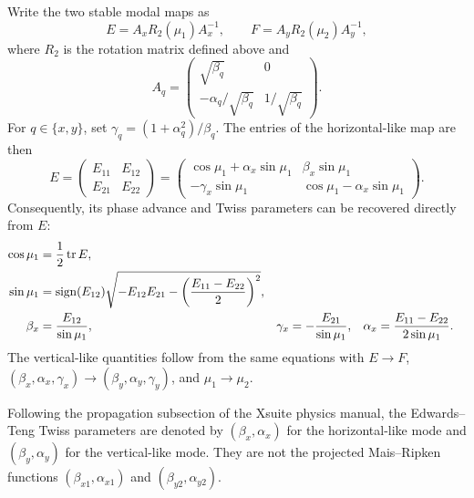 Write the two stable modal maps as
\begin{equation}
 E=A_xR_2(\mu_1)A_x^{-1},
 \qquad
 F=A_yR_2(\mu_2)A_y^{-1},
 \label{eq:et-modal-map}
\end{equation}
where $R_2$ is the rotation matrix defined above and
\begin{equation}
 A_q=
 \begin{pmatrix}
  \sqrt{\beta_q}&0\\
  -\alpha_q/\sqrt{\beta_q}&1/\sqrt{\beta_q}
 \end{pmatrix}.
 \label{eq:Aq}
\end{equation}
For $q\in\{x,y\}$, set $\gamma_q=(1+\alpha_q^2)/\beta_q$.  The entries of
the horizontal-like map are then
\begin{equation}
 E=
 \begin{pmatrix}
  E_{11}&E_{12}\\E_{21}&E_{22}
 \end{pmatrix}
 =
 \begin{pmatrix}
  \cos\mu_1+\alpha_x\sin\mu_1&\beta_x\sin\mu_1\\
  -\gamma_x\sin\mu_1&\cos\mu_1-\alpha_x\sin\mu_1
 \end{pmatrix}.
 \label{eq:E-twiss-form}
\end{equation}
Consequently, its phase advance and Twiss parameters can be recovered
directly from $E$:
\begin{align}
 \cos\mu_1
 &=\frac12\operatorname{tr} E,
 \label{eq:cosmu1-from-E}\\
 \sin\mu_1
 &=\operatorname{sign}(E_{12})
   \sqrt{-E_{12}E_{21}
   -\left(\frac{E_{11}-E_{22}}{2}\right)^2},
 \label{eq:sinmu1-from-E}\\
 \beta_x&=\frac{E_{12}}{\sin\mu_1},
 &\gamma_x&=-\frac{E_{21}}{\sin\mu_1},
 &\alpha_x&=\frac{E_{11}-E_{22}}{2\sin\mu_1}.
 \label{eq:et-twiss-from-E}
\end{align}
The vertical-like quantities follow from the same equations with
$E\to F$, $(\beta_x,\alpha_x,\gamma_x)\to
(\beta_y,\alpha_y,\gamma_y)$, and $\mu_1\to\mu_2$.

Following the propagation subsection of the Xsuite physics manual, the
Edwards--Teng Twiss parameters are denoted by $(\beta_x,\alpha_x)$ for the
horizontal-like mode and $(\beta_y,\alpha_y)$ for the vertical-like mode.
They are not the projected Mais--Ripken functions
$(\beta_{x1},\alpha_{x1})$ and $(\beta_{y2},\alpha_{y2})$.

